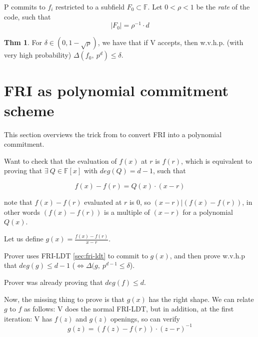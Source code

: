 \documentclass{article}
\theoremstyle{definition}
\newtheorem{theorem}[definition]{Thm}
\begin{document}
P commits to $f_i$ restricted to a subfield $F_0 \subset \mathbb{F}$.
Let $0<\rho<1$ be the \emph{rate} of the code, such that
$$|F_0| = \rho^{-1} \cdot d$$

\begin{theorem}
	For $\delta \in (0, 1-\sqrt{\rho})$, we have that if V accepts, then w.v.h.p. (with very high probability) $\Delta(f_0,~ p^d) \leq \delta$.
\end{theorem}

\section{FRI as polynomial commitment scheme}
This section overviews the trick from \cite{cryptoeprint:2019/1020} to convert FRI into a polynomial commitment.

Want to check that the evaluation of $f(x)$ at $r$ is $f(r)$, which is equivalent to proving that $\exists ~Q \in \mathbb{F}[x]$ with $deg(Q)=d-1$, such that

$$
f(x)-f(r) = Q(x) \cdot (x-r)
$$

note that $f(x)-f(r)$ evaluated at $r$ is $0$, so $(x-r) | (f(x)-f(r))$, in other words
$(f(x)-f(r))$ is a multiple of $(x-r)$ for a polynomial $Q(x)$.

Let us define $g(x) = \frac{f(x)-f(r)}{x-r}$.

Prover uses FRI-LDT \ref{sec:fri-ldt} to commit to $g(x)$, and then prove w.v.h.p that $deg(g) \leq d-1$ ($\Longleftrightarrow \Delta(g,~ p^{d-1} \leq \delta$).

Prover was already proving that $deg(f) \leq d$.

Now, the missing thing to prove is that $g(x)$ has the right shape. We can relate $g$ to $f$ as follows:
V does the normal FRI-LDT, but in addition, at the first iteration:
V has $f(z)$ and $g(z)$ openings, so can verify
$$g(z) = (f(z)-f(r))\cdot (z-r)^{-1}$$




\end{document}
